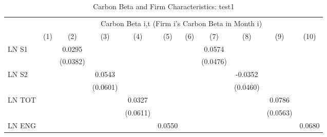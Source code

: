 \begin{table}[htbp]\centering
\def\sym#1{\ifmmode^{#1}\else\(^{#1}\)\fi}
\caption{Carbon Beta and Firm Characteristics: test1}
\begin{tabular}{l*{10}{c}}
\hline\hline
                &\multicolumn{10}{c}{Carbon Beta i,t (Firm i's Carbon Beta in Month i)}                                                                                                                       \\\cmidrule(lr){2-11}
                &\multicolumn{1}{c}{(1)}         &\multicolumn{1}{c}{(2)}         &\multicolumn{1}{c}{(3)}         &\multicolumn{1}{c}{(4)}         &\multicolumn{1}{c}{(5)}         &\multicolumn{1}{c}{(6)}         &\multicolumn{1}{c}{(7)}         &\multicolumn{1}{c}{(8)}         &\multicolumn{1}{c}{(9)}         &\multicolumn{1}{c}{(10)}         \\
\hline
LN S1           &                  &   0.0295         &                  &                  &                  &                  &   0.0574         &                  &                  &                  \\
                &                  & (0.0382)         &                  &                  &                  &                  & (0.0476)         &                  &                  &                  \\
LN S2           &                  &                  &   0.0543         &                  &                  &                  &                  &  -0.0352         &                  &                  \\
                &                  &                  & (0.0601)         &                  &                  &                  &                  & (0.0460)         &                  &                  \\
LN TOT          &                  &                  &                  &   0.0327         &                  &                  &                  &                  &   0.0786         &                  \\
                &                  &                  &                  & (0.0611)         &                  &                  &                  &                  & (0.0563)         &                  \\
LN ENG          &                  &                  &                  &                  &   0.0550         &                  &                  &                  &                  &   0.0680         \\

\end{tabular}
\end{table}

